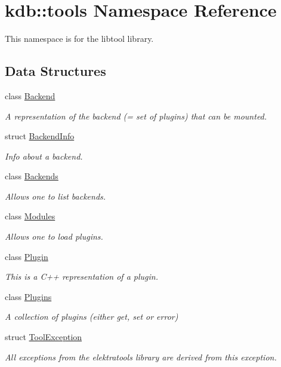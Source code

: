 \hypertarget{namespacekdb_1_1tools}{\section{kdb\-:\-:tools Namespace Reference}
\label{namespacekdb_1_1tools}
}


This namespace is for the libtool library.  


\subsection*{Data Structures}
\begin{DoxyCompactItemize}
\item 
class \hyperlink{classkdb_1_1tools_1_1Backend}{Backend}
\begin{DoxyCompactList}\small\item\em A representation of the backend (= set of plugins) that can be mounted. \end{DoxyCompactList}\item 
struct \hyperlink{structkdb_1_1tools_1_1BackendInfo}{Backend\-Info}
\begin{DoxyCompactList}\small\item\em Info about a backend. \end{DoxyCompactList}\item 
class \hyperlink{classkdb_1_1tools_1_1Backends}{Backends}
\begin{DoxyCompactList}\small\item\em Allows one to list backends. \end{DoxyCompactList}\item 
class \hyperlink{classkdb_1_1tools_1_1Modules}{Modules}
\begin{DoxyCompactList}\small\item\em Allows one to load plugins. \end{DoxyCompactList}\item 
class \hyperlink{classkdb_1_1tools_1_1Plugin}{Plugin}
\begin{DoxyCompactList}\small\item\em This is a C++ representation of a plugin. \end{DoxyCompactList}\item 
class \hyperlink{classkdb_1_1tools_1_1Plugins}{Plugins}
\begin{DoxyCompactList}\small\item\em A collection of plugins (either get, set or error) \end{DoxyCompactList}\item 
struct \hyperlink{structkdb_1_1tools_1_1ToolException}{Tool\-Exception}
\begin{DoxyCompactList}\small\item\em All exceptions from the elektratools library are derived from this exception. \end{DoxyCompactList}\end{DoxyCompactItemize}

